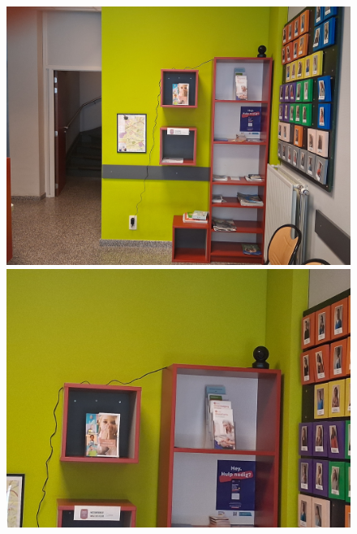 \begin{figure}[h!]
    \centering
    \begin{minipage}[b]{0.49\textwidth}
        \includegraphics[width=\textwidth]{img/bp/vertex/camera-pic2.jpg}
    \end{minipage}
    \hfill
    \begin{minipage}[b]{0.49\textwidth}
        \includegraphics[width=\textwidth]{img/bp/vertex/camera-pic1.jpg}
    \end{minipage}
    
    \vspace{0.5em} %
    

\end{figure}
